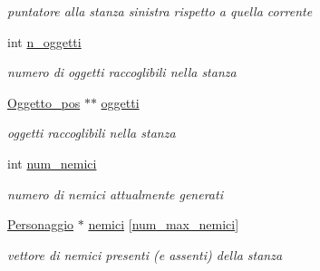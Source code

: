 \begin{DoxyCompactItemize}
\begin{DoxyCompactList}\small\item\em puntatore alla stanza sinistra rispetto a quella corrente \end{DoxyCompactList}\item 
\hypertarget{classStanza_aea771b438aed5500cc5de7128b983980}{}int \hyperlink{classStanza_aea771b438aed5500cc5de7128b983980}{n\+\_\+oggetti}\label{classStanza_aea771b438aed5500cc5de7128b983980}

\begin{DoxyCompactList}\small\item\em numero di oggetti raccoglibili nella stanza \end{DoxyCompactList}\item 
\hypertarget{classStanza_a6382ef202b181ce7cf10793b8eeea2f3}{}\hyperlink{structOggetto__pos}{Oggetto\+\_\+pos} $\ast$$\ast$ \hyperlink{classStanza_a6382ef202b181ce7cf10793b8eeea2f3}{oggetti}\label{classStanza_a6382ef202b181ce7cf10793b8eeea2f3}

\begin{DoxyCompactList}\small\item\em oggetti raccoglibili nella stanza \end{DoxyCompactList}\item 
\hypertarget{classStanza_a79632b76d7a97af52b5d350825333615}{}int \hyperlink{classStanza_a79632b76d7a97af52b5d350825333615}{num\+\_\+nemici}\label{classStanza_a79632b76d7a97af52b5d350825333615}

\begin{DoxyCompactList}\small\item\em numero di nemici attualmente generati \end{DoxyCompactList}\item 
\hypertarget{classStanza_a95599af893affa58946f48214103915d}{}\hyperlink{classPersonaggio}{Personaggio} $\ast$ \hyperlink{classStanza_a95599af893affa58946f48214103915d}{nemici} \mbox{[}\hyperlink{classStanza_a3ee6dc829044d6b19fa3ef214ffd3ac9}{num\+\_\+max\+\_\+nemici}\mbox{]}\label{classStanza_a95599af893affa58946f48214103915d}

\begin{DoxyCompactList}\small\item\em vettore di nemici presenti (e assenti) della stanza \end{DoxyCompactList}\end{DoxyCompactItemize}
